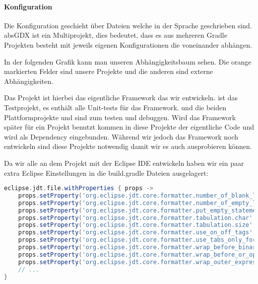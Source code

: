 \paragraph{Konfiguration}

Die Konfiguration geschieht über  Dateien welche in der Sprache  geschrieben sind.
absGDX ist ein Multiprojekt, dies bedeutet, dass es  aus mehreren Gradle Projekten besteht mit jeweils eigenen Konfigurationen die voneinander abhängen. \cite[S. 79ff]{BATWG}

In der folgenden Grafik kann man unseren Abhängigkeitsbaum sehen. Die orange markierten Felder sind unsere Projekte und die anderen sind externe Abhängigkeiten.


Das Projekt  ist hierbei das eigentliche Framework das wir entwickeln.  ist das Testprojekt, es enthält alle Unit-tests für das Framework.
 und die beiden Plattformprojekte  und  sind zum testen und debuggen. Wird das Framework später für ein Projekt benutzt kommen in diese Projekte der eigentliche Code und  wird als Dependency eingebunden. Während wir jedoch das Framework noch entwickeln sind diese Projekte notwendig damit wir es auch ausprobieren können.

Da wir alle an dem Projekt mit der Eclipse IDE entwickeln haben wir ein paar extra Eclipse Einstellungen in die build.gradle Dateien ausgelagert:

\doinline
\begin{lstlisting}[caption=Eclipse Optionen in gradle setzen, title=\hspace{0 pt}, language=groovy]
eclipse.jdt.file.withProperties { props ->
    props.setProperty('org.eclipse.jdt.core.formatter.number_of_blank_lines_at_beginning_of_method_body', '0')
    props.setProperty('org.eclipse.jdt.core.formatter.number_of_empty_lines_to_preserve', '1')
    props.setProperty('org.eclipse.jdt.core.formatter.put_empty_statement_on_new_line', 'true')
    props.setProperty('org.eclipse.jdt.core.formatter.tabulation.char', 'tab')
    props.setProperty('org.eclipse.jdt.core.formatter.tabulation.size', '4')
    props.setProperty('org.eclipse.jdt.core.formatter.use_on_off_tags', 'false')
    props.setProperty('org.eclipse.jdt.core.formatter.use_tabs_only_for_leading_indentations', 'false')
    props.setProperty('org.eclipse.jdt.core.formatter.wrap_before_binary_operator', 'true')
    props.setProperty('org.eclipse.jdt.core.formatter.wrap_before_or_operator_multicatch', 'true')
    props.setProperty('org.eclipse.jdt.core.formatter.wrap_outer_expressions_when_nested', 'true')
    // ...
}
\end{lstlisting}

